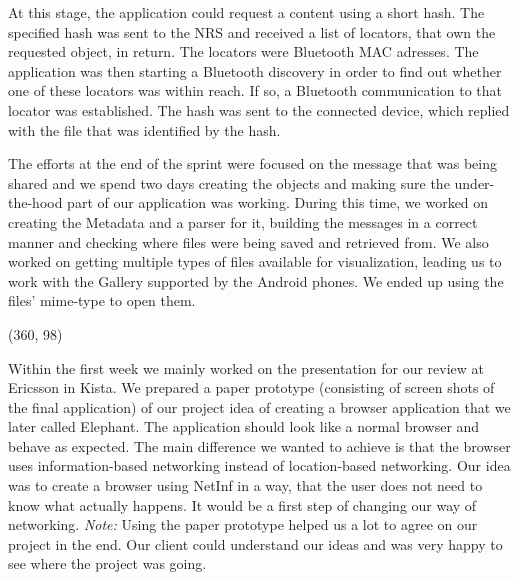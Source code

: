 At this stage, the application could request a content using a short hash.
The specified hash was sent to the NRS and received a list of locators, that own
the requested object, in return. The locators were Bluetooth MAC adresses.
The application was then starting a Bluetooth discovery in order to find out
whether one of these locators was within reach. If so, a Bluetooth communication
to that locator was established. The hash was sent to the connected device, which
replied with the file that was identified by the hash.

The efforts at the end of the sprint were focused on the message that was being shared
and we spend two days creating the objects and making sure the under-the-hood part of
our application was working. During this time, we worked on creating the Metadata and a
parser for it, building the messages in a correct manner and checking where files were
being saved and retrieved from. We also worked on getting multiple types of files available
for visualization, leading us to work with the Gallery supported by the Android phones.
We ended up using the files' mime-type to open them.

\framebox(360, 98){
}

Within the first week we mainly worked on the presentation for our review at Ericsson in Kista.
We prepared a paper prototype (consisting of screen shots of the final application) of our 
project idea of creating a browser application that we later called
Elephant.
The application should look like a normal browser and behave as expected. The main difference
we wanted to achieve is that the browser uses information-based networking instead of location-based
networking. Our idea was to create a browser using NetInf in a way, that the user does not
need to know what actually happens. It would be a first step of changing our way of 
networking. \textit{Note:} Using the paper prototype helped us a lot to agree on our
project in the end. Our client could understand our ideas and was very happy to
see where the project was going.

